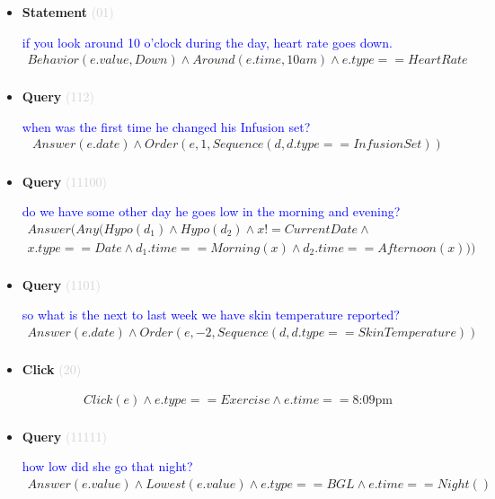 \documentclass[11pt]{article}
\newcommand{\key}[1]{\textcolor{lightgray}{#1}}
\newcounter{CQuery}
\newcounter{CStatement}
\newcounter{CClick}
\begin{document}
\begin{itemize}
\item
\textbf{Statement\theCStatement} \key{(01)} \addtocounter{CStatement}{1}
\textcolor{blue}{ if you look around 10 o'clock during the day, heart rate goes down. }
\begin{multline*}
Behavior(e.value, Down) \wedge Around(e.time, 10am) \wedge e.type==HeartRate \\ 
\end{multline*}


\item
\textbf{Query\theCQuery} \key{(112)} \addtocounter{CQuery}{1}
\textcolor{blue}{ when was the first time he changed his Infusion set? }
\begin{multline*}
Answer(e.date) \wedge Order(e, 1, Sequence(d, d.type==InfusionSet)) \\ 
\end{multline*}


\item
\textbf{Query\theCQuery} \key{(11100)} \addtocounter{CQuery}{1}
\textcolor{blue}{ do we have some other day he goes low in the morning and evening? }
\begin{multline*}
Answer(Any(Hypo(d_1) \wedge Hypo(d_2) \wedge x != CurrentDate \wedge \\ 
x.type==Date \wedge d_1.time==Morning(x) \wedge d_2.time==Afternoon(x))) \\ 
\end{multline*}


\item
\textbf{Query\theCQuery} \key{(1101)} \addtocounter{CQuery}{1}
\textcolor{blue}{ so what is the next to last week we have skin temperature reported? }
\begin{multline*}
Answer(e.date) \wedge Order(e, -2, Sequence(d, d.type==SkinTemperature)) \\ 
\end{multline*}


\item
\textbf{Click\theCClick} \key{(20)} \addtocounter{CClick}{1}
\textcolor{blue}{  }
\begin{multline*}
Click(e) \wedge e.type==Exercise \wedge e.time==\mbox{8:09pm} \\ 
\end{multline*}


\item
\textbf{Query\theCQuery} \key{(11111)} \addtocounter{CQuery}{1}
\textcolor{blue}{ how low did she go that night? }
\begin{multline*}
Answer(e.value) \wedge Lowest(e.value) \wedge e.type==BGL \wedge e.time==Night() \\ 
\end{multline*}



\end{itemize}
\end{document}

